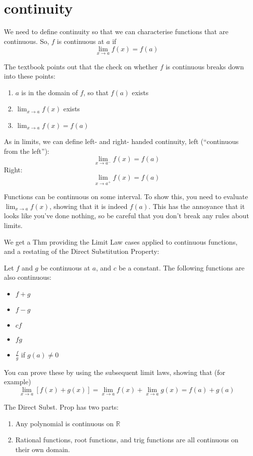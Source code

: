 \documentclass[10pt,a4paper]{report}
\begin{document}
\section{continuity}

We need to define continuity so that we can characterise functions that are continuous. So, $f$ is continuous at $a$ if
$$
	\lim_{x \to a} f(x) = f(a)
$$

The textbook points out that the check on whether $f$ is continuous breaks down into these points:

\begin{enumerate}
	\item $a$ is in the domain of $f$, so that $f(a)$ exists
	\item $\lim_{x \to a} f(x)$ exists
	\item $\lim_{x \to a} f(x) = f(a)$
\end{enumerate}

As in limits, we can define left- and right- handed continuity,
left (``continuous from the left''):
$$
	\lim_{x \to a^-} f(x) = f(a)
$$
Right:
$$
	\lim_{x \to a^+} f(x) = f(a)
$$

Functions can be continuous on some interval. To show this, you need to evaluate $\lim_{x \to a} f(x)$, showing that it is indeed $f(a)$. This has the annoyance that it looks like you've done nothing, so be careful that you don't break any rules about limits.

We get a Thm providing the Limit Law cases applied to continuous functions, and a restating of the Direct Substitution Property:

Let $f$ and $g$ be continuous at $a$, and $c$ be a constant. The following functions are also continuous:

\begin{itemize}
	\item $f + g$
	\item $f - g$
	\item $cf$
	\item $fg$
	\item $\frac{f}{g}$ if $g(a) \ne 0$
\end{itemize}

You can prove these by using the subsequent limit laws, showing that (for example) 
$$
\lim_{x \to a} [f(x) + g(x)] = \lim_{x \to a} f(x) + \lim_{x \to a} g(x) = f(a) + g(a)
$$

The Direct Subst. Prop has two parts:

\begin{enumerate}
	\item Any polynomial is continuous on $\mathbb{R}$
	\item Rational functions, root functions, and trig functions are all continuous on their own domain.
\end{enumerate}
\end{document}
